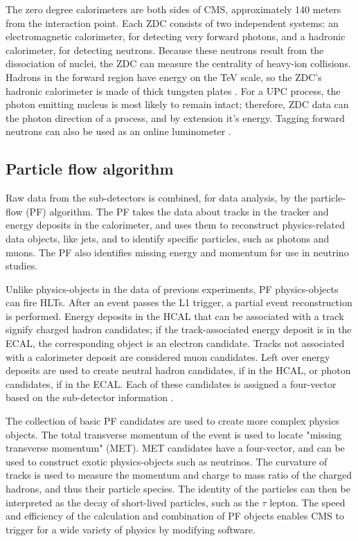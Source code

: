 The zero degree calorimeters are both sides of CMS, approximately 140 meters from the interaction point. Each ZDC consists of two independent systems: an electromagnetic calorimeter, for detecting very forward photons, and a hadronic calorimeter, for detecting neutrons. Because these neutrons result from the dissociation of nuclei, the ZDC can measure the centrality of heavy-ion collisions. Hadrons in the forward region have energy on the TeV scale, so the ZDC's hadronic calorimeter is made of thick tungsten plates \cite{Grachov:2006ke}. For a UPC process, the photon emitting nucleus is most likely to remain intact; therefore, ZDC data can the photon direction of a process, and by extension it's energy. Tagging forward neutrons can also be used as an online luminometer \cite{emPCite3}.

\subsection{Particle flow algorithm}

Raw data from the sub-detectors is combined, for data analysis, by the particle-flow (PF) algorithm. The PF takes the data about tracks in the tracker and energy deposits in the calorimeter, and uses them to reconstruct physics-related data objects, like jets, and to identify specific particles, such as photons and muons. The PF also identifies missing energy and momentum for use in neutrino studies. 

Unlike physics-objects in the data of previous experiments, PF physics-objects can fire HLTs. After an event passes the L1 trigger, a partial event reconstruction is performed. Energy deposits in the HCAL that can be associated with a track signify charged hadron candidates; if the track-associated energy deposit is in the ECAL, the corresponding object is an electron candidate. Tracks not associated with a calorimeter deposit are considered muon candidates. Left over energy deposits are used to create neutral hadron candidates, if in the HCAL, or photon candidates, if in the ECAL. Each of these candidates is assigned a four-vector based on the sub-detector information \cite{Beaudette:2014cea}. 

The collection of basic PF candidates are used to create more complex physics objects. The total transverse momentum of the event is used to locate "missing transverse momentum" (MET). MET candidates have a four-vector, and can be used to construct exotic physics-objects such as neutrinos. The curvature of tracks is used to measure the momentum and charge to mass ratio of the charged hadrons, and thus their particle species. The identity of the particles can then be interpreted as the decay of short-lived particles, such as the $\tau$ lepton. The speed and efficiency of the calculation and combination of PF objects enables CMS to trigger for a wide variety of physics by modifying software.

